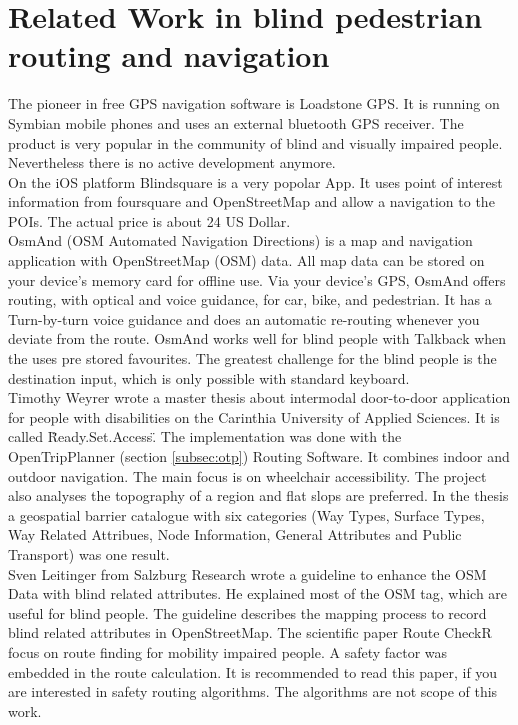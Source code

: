 \documentclass{sig-alternate}
\begin{document}
\section{Related Work in blind pedestrian routing and navigation}
The pioneer in free GPS navigation software is Loadstone GPS\cite{loadstone}. It is running on Symbian mobile phones and uses an external bluetooth GPS receiver. The product is very popular in the community of blind and visually impaired people. Nevertheless there is no active development anymore. \\
On the iOS platform Blindsquare\cite{blindsquare} is a very popolar App. It uses point of interest information from foursquare and OpenStreetMap and allow a navigation to the POIs. The actual price is about 24 US Dollar. \\
OsmAnd (OSM Automated Navigation Directions) is a map and navigation application with OpenStreetMap (OSM) data. All map data can be stored on your device's memory card for offline use. Via your device's GPS, OsmAnd offers routing, with optical and voice guidance, for car, bike, and pedestrian. It has a Turn-by-turn voice guidance and does an automatic re-routing whenever you deviate from the route. OsmAnd works well for blind people with Talkback when the uses pre stored favourites. The greatest challenge for the blind people is the destination input, which is only possible with standard keyboard.  \\
Timothy Weyrer\cite{weyrer} wrote a master thesis about intermodal door-to-door application for people with disabilities on the Carinthia University of Applied Sciences. It is called \"Ready.Set.Access\". The implementation was done with the OpenTripPlanner (section \ref{subsec:otp}) Routing Software. It combines indoor and outdoor navigation. The main focus is on wheelchair accessibility. The project also analyses the topography of a region and flat slops are preferred. In the thesis a geospatial barrier catalogue with six categories (Way Types, Surface Types, Way Related Attribues, Node Information, General Attributes and Public Transport) was one result. \\
Sven Leitinger\cite{sven:osm} from Salzburg Research wrote a guideline to enhance the OSM Data with blind related attributes. He explained most of the OSM tag, which are useful for blind people. The guideline describes the mapping process to record blind related attributes in OpenStreetMap.
The scientific paper\cite{Volkel:2008} Route CheckR focus on route finding for mobility impaired people. A safety factor was embedded in the route calculation. It is recommended to read this paper, if you are interested in safety routing algorithms. The algorithms are not scope of this work.  
\end{document}
